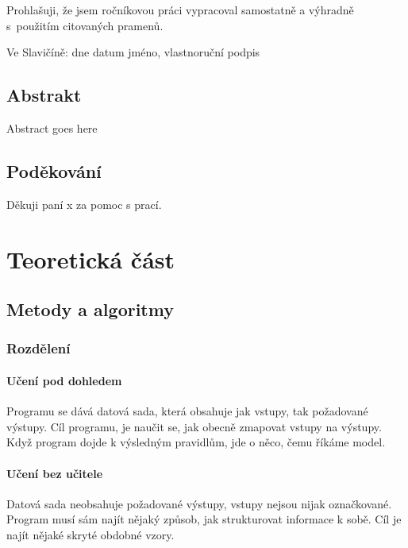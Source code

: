 \documentclass[a4paper,12pt, oneside]{book}
\begin{document}
\newpage
\mbox{}
\newpage


\noindent
Prohlašuji, že jsem ročníkovou práci vypracoval samostatně
a výhradně s použitím citovaných pramenů.

Ve Slavičíně: dne datum jméno, vlastnoruční podpis


\newpage
\section*{Abstrakt}
Abstract goes here

\newpage
\section*{Poděkování}
Děkuji paní x za pomoc s prací.

\tableofcontents

\clearpage

\chapter{Teoretická část}



\section{Metody a algoritmy}

\subsection{Rozdělení}

\subsubsection{Učení pod dohledem}

Programu se dává datová sada, která obsahuje jak vstupy, tak požadované výstupy. Cíl programu,
je naučit se, jak obecně zmapovat vstupy na výstupy. Když program dojde k výsledným pravidlům,
jde o něco, čemu říkáme model.

\subsubsection{Učení bez učitele}

Datová sada neobsahuje požadované výstupy, vstupy nejsou nijak označkované. Program musí sám najít nějaký
způsob, jak	strukturovat informace k sobě. Cíl je najít nějaké skryté obdobné vzory.
\end{document}
